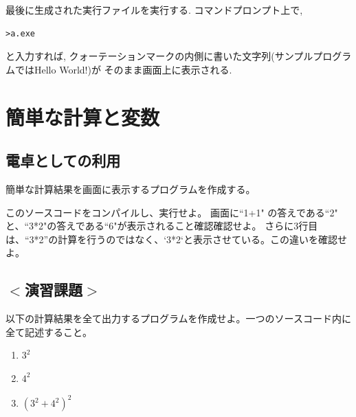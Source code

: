 \documentclass[a4j]{jsbook}
\begin{document}
最後に生成された実行ファイルを実行する. コマンドプロンプト上で, 
\begin{Verbatim}[frame=single]
>a.exe
\end{Verbatim}
と入力すれば, クォーテーションマークの内側に書いた文字列(サンプルプログラムではHello World!)が
そのまま画面上に表示される. 

\section{簡単な計算と変数}
\subsection*{電卓としての利用}
簡単な計算結果を画面に表示するプログラムを作成する。

このソースコードをコンパイルし、実行せよ。
画面に``1+1" の答えである``2" と、``3*2"の答えである``6"が表示されること確認確認せよ。
さらに3行目は、``3*2”の計算を行うのではなく、`3*2`と表示させている。この違いを確認せよ。

\subsection*{$<$演習課題$>$}
以下の計算結果を全て出力するプログラムを作成せよ。一つのソースコード内に全て記述すること。
\begin{enumerate}
\item $3^2$
\item $4^2$
\item $(3^2+4^2)^2$
\end{enumerate}
\end{document}
